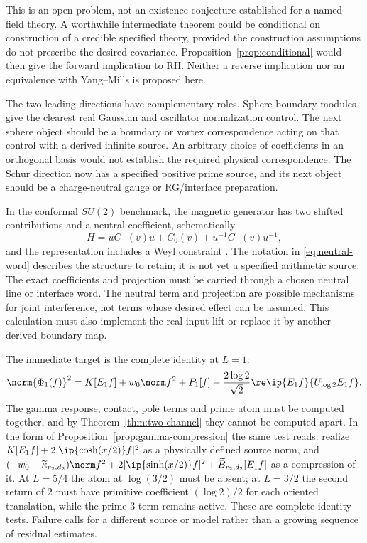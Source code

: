 This is an open problem, not an existence conjecture established for
a named field theory. A worthwhile intermediate theorem could be
conditional on construction of a credible specified theory, provided
the construction assumptions do not prescribe the desired covariance.
Proposition~\ref{prop:conditional} would then give the forward
implication to RH. Neither a reverse implication nor an equivalence
with Yang--Mills is proposed here.

The two leading directions have complementary roles. Sphere boundary
modules give the clearest real Gaussian and oscillator normalization
control. The next sphere object should be a boundary or vortex
correspondence acting on that control with a derived infinite source.
An arbitrary choice of coefficients in an orthogonal basis would not
establish the required physical correspondence. The Schur direction
now has a specified positive prime source, and its next object should
be a charge-neutral gauge or RG/interface preparation.

In the conformal $SU(2)$ benchmark, the magnetic generator has two
shifted contributions and a neutral coefficient, schematically
\begin{equation}\label{eq:neutral-word}
 H=uC_+(v)u+C_0(v)+u^{-1}C_-(v)u^{-1},
\end{equation}
and the representation includes a Weyl constraint
\cite[Sections 5.1.2--5.1.3]{Schur}. The notation in
\eqref{eq:neutral-word} describes the structure to retain; it is not
yet a specified arithmetic source. The exact coefficients and projection
must be carried through a chosen neutral line or interface word. The
neutral term and projection are possible mechanisms for joint
interference, not terms whose desired effect can be assumed. This
calculation must also implement the real-input lift or replace it by
another derived boundary map.

The immediate target is the complete identity at $L=1$:
\begin{equation}\label{eq:first-target}
 \norm{\Phi_1(f)}^2=K[E_1f]+w_0\norm f^2+P_1[f]
 -\frac{2\log2}{\sqrt2}\re\ip{E_1f}{U_{\log2}E_1f}.
\end{equation}
The gamma response, contact, pole terms and prime atom must be computed
together, and by Theorem~\ref{thm:two-channel} they cannot be computed
apart. In the form of Proposition~\ref{prop:gamma-compression} the same test
reads: realize $K[E_1f]+2|\ip{\cosh(x/2)}f|^2$ as a physically defined source
norm, and
$(-w_0-\widetilde\kappa_{r_2,d_2})\norm f^2+2|\ip{\sinh(x/2)}f|^2
+\widetilde B_{r_2,d_2}[E_1f]$ as a compression of it. At $L=5/4$ the atom at $\log(3/2)$ must be absent; at $L=3/2$
the second return of $2$ must have primitive coefficient $(\log2)/2$
for each oriented translation, while the prime $3$ term remains active.
These are complete identity tests. Failure calls for a different source
or model rather than a growing sequence of residual estimates.

